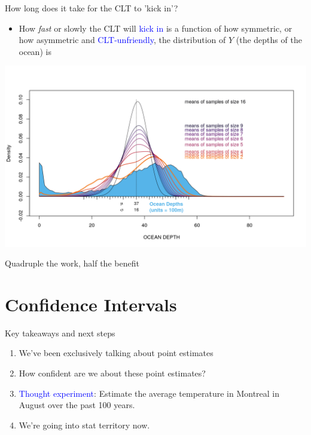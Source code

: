 \documentclass[10pt]{beamer}\usepackage[]{graphicx}\usepackage[]{color}
\begin{document}
\begin{frame}[fragile]{How long does it take for the CLT to 'kick in'?}
	\begin{itemize}
		\item How \textit{fast} or slowly the CLT will \textcolor{blue}{kick in} is a function of how symmetric, or how asymmetric and \textcolor{blue}{CLT-unfriendly}, the distribution of $Y$ (the depths of the ocean) is
	\end{itemize}
	
	
	\includegraphics[width=\textwidth,height=0.8\textheight,keepaspectratio]{oceanAll.png}
\end{frame}



\begin{frame}[fragile]{Quadruple the work, half the benefit}
	
\end{frame}


\section{Confidence Intervals}


\begin{frame}{Key takeaways and next steps}
	\begin{enumerate}
		\setlength\itemsep{2em}
		\item We've been exclusively talking about point estimates \pause
		\item How confident are we about these point estimates? \pause
		\item \textcolor{blue}{Thought experiment}: Estimate the average temperature in Montreal in August over the past 100 years. \pause  
		\item We're going into stat territory now. 
	\end{enumerate}
\end{frame}
\end{document}

